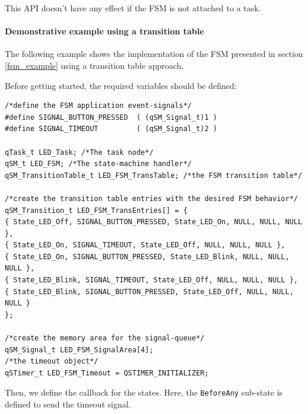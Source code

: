 \documentclass{article}
\begin{document}
\begin{tcolorbox}
\HandRight This API doesn't have any effect if the FSM is not attached to a task.
\end{tcolorbox}

\paragraph{Demonstrative example using a transition table}
The following example shows the implementation of the FSM presented in section \ref{fsm_example} using a transition table approach.

Before getting started, the required variables should be defined: \\

\begin{lstlisting}[style=CStyle]
/*define the FSM application event-signals*/
#define SIGNAL_BUTTON_PRESSED  ( (qSM_Signal_t)1 )
#define SIGNAL_TIMEOUT         ( (qSM_Signal_t)2 )

qTask_t LED_Task; /*The task node*/
qSM_t LED_FSM; /*The state-machine handler*/
qSM_TransitionTable_t LED_FSM_TransTable; /*the FSM transition table*/

/*create the transition table entries with the desired FSM behavior*/
qSM_Transition_t LED_FSM_TransEntries[] = {
{ State_LED_Off, SIGNAL_BUTTON_PRESSED, State_LED_On, NULL, NULL, NULL },
{ State_LED_On, SIGNAL_TIMEOUT, State_LED_Off, NULL, NULL, NULL },
{ State_LED_On, SIGNAL_BUTTON_PRESSED, State_LED_Blink, NULL, NULL, NULL },
{ State_LED_Blink, SIGNAL_TIMEOUT, State_LED_Off, NULL, NULL, NULL },
{ State_LED_Blink, SIGNAL_BUTTON_PRESSED, State_LED_Off, NULL, NULL, NULL }
};

/*create the memory area for the signal-queue*/
qSM_Signal_t LED_FSM_SignalArea[4];
/*the timeout object*/
qSTimer_t LED_FSM_Timeout = QSTIMER_INITIALIZER;
\end{lstlisting}

Then, we define the callback for the states. Here, the \lstinline{BeforeAny} sub-state is defined to send the timeout signal. \\
\end{document}
